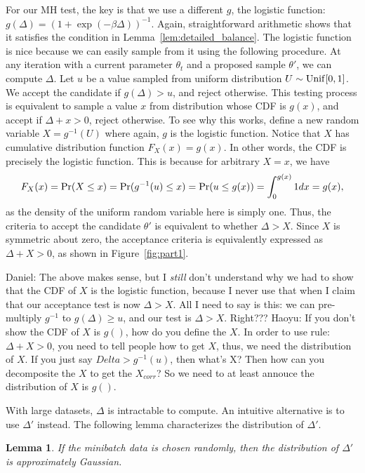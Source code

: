 \documentclass{article}
\newtheorem{lemma}{Lemma}
\begin{document}
For our MH test, the key is that we use a different $g$, the logistic function: $g(\Delta) =
(1+\exp(-\beta \Delta))^{-1}$. Again, straightforward arithmetic shows that it satisfies the condition in
Lemma~\ref{lem:detailed_balance}.  The logistic function is nice because we can easily sample from
it using the following procedure. At
any iteration with a current parameter $\theta_t$ and a proposed sample $\theta'$, we can compute
$\Delta$. Let $u$ be a value sampled from uniform distribution $U \sim {\rm Unif}[0,1]$. We accept the candidate if $g(\Delta) > u$, and reject otherwise. This testing process is equivalent to sample a value $x$ from distribution whose CDF is $g(x)$, and accept if $\Delta + x > 0$, reject otherwise. To see why this works,
define a new random variable $X = g^{-1}(U)$ where again, $g$ is the logistic function. Notice that
$X$ has cumulative distribution function $F_X(x) = g(x)$. In other words, the CDF is precisely the
logistic function. This is because for arbitrary $X = x$, we have
\[
F_X(x) = {\rm Pr}(X \le x) = {\rm Pr}(g^{-1}(u) \le x) = {\rm Pr}(u \le g(x)) = \int_{0}^{g(x)} 1 dx = g(x),
\]
as the density of the uniform random variable here is simply one. Thus, the criteria to accept the
candidate $\theta'$ is equivalent to whether $\Delta > X$. Since $X$ is symmetric about zero, the
acceptance criteria is equivalently expressed as $\Delta + X>0$, as shown in Figure~\ref{fig:part1}.

{\color{blue}
Daniel: The above makes sense, but I \emph{still} don't understand why we had to show that the CDF
of $X$ is the logistic function, because I never use that when I claim that our acceptance test is
now $\Delta > X$. All I need to say is this: we can pre-multiply $g^{-1}$ to $g(\Delta) \ge u$, and
our test is $\Delta > X$. Right???
}
{\color{red}
Haoyu: If you don't show the CDF of $X$ is $g()$, how do you define the $X$. In order to use rule: $\Delta +X >0$, you need to tell people how to get $X$, thus, we need the distribution of $X$. If you just say $Delta > g^{-1}(u)$, then what's X? Then how can you decomposite the $X$ to get the $X_{corr}$? So we need to at least annouce the distribution of $X$ is $g()$.
}

With large datasets, $\Delta$ is intractable to compute. An intuitive alternative is to use
$\Delta'$ instead. The following lemma characterizes the distribution of $\Delta'$.

\begin{lemma}\label{lem:gaussian}
If the minibatch data is chosen randomly, then the distribution of $\Delta'$ is approximately Gaussian.
\end{lemma}
\end{document}
